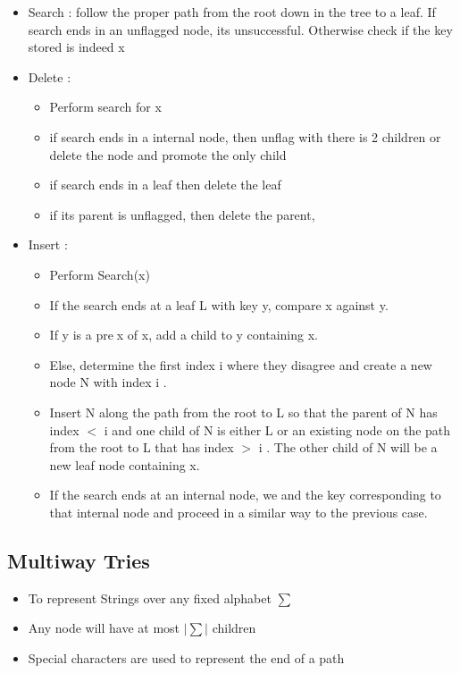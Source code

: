\documentclass{article}
\begin{document}
\begin{itemize}
\item Search : follow the proper path from the root down in the tree to a leaf. If search ends in an unflagged node, its unsuccessful. Otherwise check if the key stored is indeed x
\item Delete :
\begin{itemize}
\item Perform search for x
\item if search ends in a internal node, then unflag with there is 2 children or delete the node and promote the only child 
\item if search ends in a leaf then delete the leaf
\item if its parent is unflagged, then delete the parent, 
\end{itemize}
\item Insert : 
\begin{itemize}
\item Perform Search(x)
\item If the search ends at a leaf L with key y, compare x against y.
\item If y is a prex of x, add a child to y containing x.
\item Else, determine the first index i where they disagree and create a new node N with index i .
\item Insert N along the path from the root to L so that the parent of N has index \(<\) i and one child of N is either L or an existing node on the path
from the root to L that has index \(>\) i .
The other child of N will be a new leaf node containing x.
\item If the search ends at an internal node, we and the key corresponding to
that internal node and proceed in a similar way to the previous case.
\end{itemize}
\end{itemize}

\subsection*{Multiway Tries}
\begin{itemize}
\item To represent Strings over any fixed alphabet \(\sum\)
\item Any node will have at most \(\mid \sum \mid \) children 
\item Special characters are used to represent the end of a path 
\end{itemize}
\end{document}
